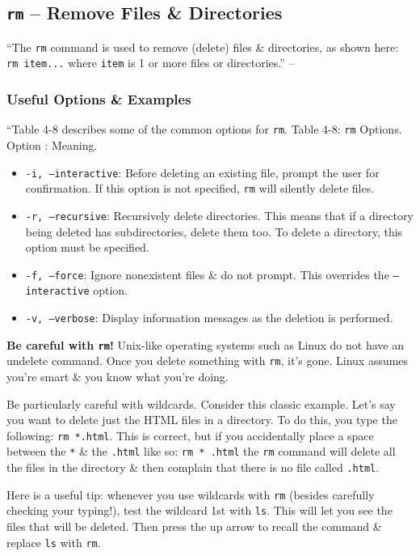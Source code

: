 \documentclass[oneside]{book}
\numberwithin{equation}{section}
\begin{document}
\subsection{\texttt{rm} -- Remove Files \& Directories}
``The \texttt{rm} command is used to remove (delete) files \& directories, as shown here: \texttt{rm item...} where \texttt{item} is 1 or more files or directories.'' -- \cite[pp. 71--7]{Shotts2019}

\subsubsection{Useful Options \& Examples}
``Table 4-8 describes some of the common options for \texttt{rm}. \textsf{Table 4-8: \texttt{rm} Options. Option : Meaning.}
\begin{itemize}
	\item \texttt{-i, --interactive}: Before deleting an existing file, prompt the user for confirmation. If this option is not specified, \texttt{rm} will silently delete files.
	\item \texttt{-r, --recursive}: Recursively delete directories. This means that if a directory being deleted has subdirectories, delete them too. To delete a directory, this option must be specified.
	\item \texttt{-f, --force}: Ignore nonexistent files \& do not prompt. This overrides the \texttt{--interactive} option.
	\item \texttt{-v, --verbose}: Display information messages as the deletion is performed.
\end{itemize}
\textbf{Be careful with \texttt{rm}!} Unix-like operating systems such as Linux do not have an undelete command. Once you delete something with \texttt{rm}, it's gone. Linux assumes you're smart \& you know what you're doing.

Be particularly careful with wildcards. Consider this classic example. Let's say you want to delete just the HTML files in a directory. To do this, you type the following: \texttt{rm *.html}. This is correct, but if you accidentally place a space between the \texttt{*} \& the \texttt{.html} like so: \texttt{rm * .html} the \texttt{rm} command will delete all the files in the directory \& then complain that there is no file called \texttt{.html}.

Here is a useful tip: whenever you use wildcards with \texttt{rm} (besides carefully checking your typing!), test the wildcard 1st with \texttt{ls}. This will let you see the files that will be deleted. Then press the up arrow to recall the command \& replace \texttt{ls} with \texttt{rm}.
\end{document}
